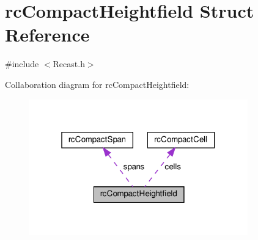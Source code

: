 \hypertarget{structrcCompactHeightfield}{}\section{rc\+Compact\+Heightfield Struct Reference}
\label{structrcCompactHeightfield}


{\ttfamily \#include $<$Recast.\+h$>$}



Collaboration diagram for rc\+Compact\+Heightfield\+:
\nopagebreak
\begin{figure}[H]
\begin{center}
\leavevmode
\includegraphics[width=268pt]{structrcCompactHeightfield__coll__graph}
\end{center}
\end{figure}
